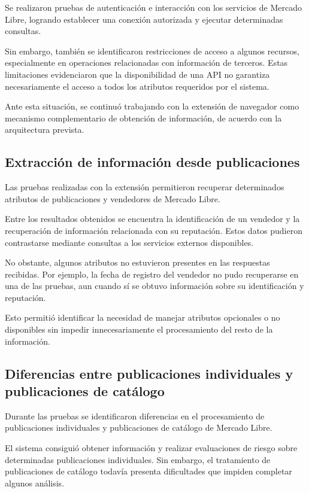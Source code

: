 Se realizaron pruebas de autenticación e interacción con los servicios
de Mercado Libre, logrando establecer una conexión autorizada y ejecutar
determinadas consultas.

Sin embargo, también se identificaron restricciones de acceso a algunos
recursos, especialmente en operaciones relacionadas con información de
terceros. Estas limitaciones evidenciaron que la disponibilidad de una
API no garantiza necesariamente el acceso a todos los atributos
requeridos por el sistema.

Ante esta situación, se continuó trabajando con la extensión de
navegador como mecanismo complementario de obtención de información, de
acuerdo con la arquitectura prevista.

\subsection{Extracción de información desde publicaciones}

Las pruebas realizadas con la extensión permitieron recuperar
determinados atributos de publicaciones y vendedores de Mercado Libre.

Entre los resultados obtenidos se encuentra la identificación de un
vendedor y la recuperación de información relacionada con su reputación.
Estos datos pudieron contrastarse mediante consultas a los servicios
externos disponibles.

No obstante, algunos atributos no estuvieron presentes en las respuestas
recibidas. Por ejemplo, la fecha de registro del vendedor no pudo
recuperarse en una de las pruebas, aun cuando sí se obtuvo información
sobre su identificación y reputación.

Esto permitió identificar la necesidad de manejar atributos opcionales o
no disponibles sin impedir innecesariamente el procesamiento del resto
de la información.

\subsection{Diferencias entre publicaciones individuales y publicaciones de catálogo}

Durante las pruebas se identificaron diferencias en el procesamiento de
publicaciones individuales y publicaciones de catálogo de Mercado Libre.

El sistema consiguió obtener información y realizar evaluaciones de
riesgo sobre determinadas publicaciones individuales. Sin embargo, el
tratamiento de publicaciones de catálogo todavía presenta dificultades
que impiden completar algunos análisis.

